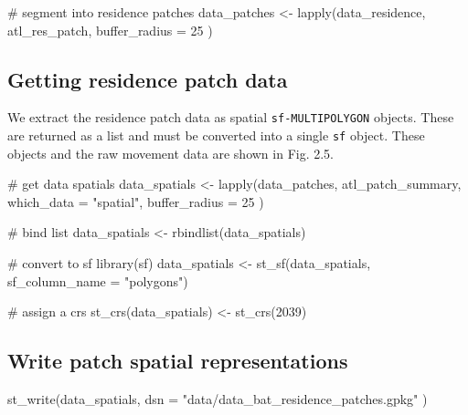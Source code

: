 \documentclass[]{scrreprt}
\newenvironment{Shaded}{}{}
\newcommand{\CommentTok}[1]{\textcolor[rgb]{0.00,0.50,0.00}{#1}}
\newcommand{\DataTypeTok}[1]{#1}
\newcommand{\DecValTok}[1]{#1}
\newcommand{\KeywordTok}[1]{\textcolor[rgb]{0.00,0.00,1.00}{#1}}
\newcommand{\NormalTok}[1]{#1}
\newcommand{\StringTok}[1]{\textcolor[rgb]{0.00,0.50,0.50}{#1}}
\begin{document}
\begin{Shaded}
\begin{Highlighting}[]
\CommentTok{# segment into residence patches}
\NormalTok{data_patches <-}\StringTok{ }\KeywordTok{lapply}\NormalTok{(data_residence, atl_res_patch,}
  \DataTypeTok{buffer_radius =} \DecValTok{25}
\NormalTok{)}
\end{Highlighting}
\end{Shaded}

\hypertarget{getting-residence-patch-data}{%
\subsection{Getting residence patch data}\label{getting-residence-patch-data}}

We extract the residence patch data as spatial \texttt{sf-MULTIPOLYGON} objects.
These are returned as a list and must be converted into a single \texttt{sf} object.
These objects and the raw movement data are shown in Fig. 2.5.

\begin{Shaded}
\begin{Highlighting}[]
\CommentTok{# get data spatials}
\NormalTok{data_spatials <-}\StringTok{ }\KeywordTok{lapply}\NormalTok{(data_patches, atl_patch_summary,}
  \DataTypeTok{which_data =} \StringTok{"spatial"}\NormalTok{,}
  \DataTypeTok{buffer_radius =} \DecValTok{25}
\NormalTok{)}

\CommentTok{# bind list}
\NormalTok{data_spatials <-}\StringTok{ }\KeywordTok{rbindlist}\NormalTok{(data_spatials)}

\CommentTok{# convert to sf}
\KeywordTok{library}\NormalTok{(sf)}
\NormalTok{data_spatials <-}\StringTok{ }\KeywordTok{st_sf}\NormalTok{(data_spatials, }\DataTypeTok{sf_column_name =} \StringTok{"polygons"}\NormalTok{)}

\CommentTok{# assign a crs}
\KeywordTok{st_crs}\NormalTok{(data_spatials) <-}\StringTok{ }\KeywordTok{st_crs}\NormalTok{(}\DecValTok{2039}\NormalTok{)}
\end{Highlighting}
\end{Shaded}

\hypertarget{write-patch-spatial-representations}{%
\subsection{Write patch spatial representations}\label{write-patch-spatial-representations}}

\begin{Shaded}
\begin{Highlighting}[]
\KeywordTok{st_write}\NormalTok{(data_spatials,}
  \DataTypeTok{dsn =} \StringTok{"data/data_bat_residence_patches.gpkg"}
\NormalTok{)}
\end{Highlighting}
\end{Shaded}
\end{document}
